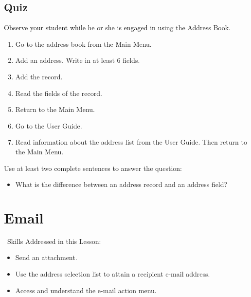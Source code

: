 \documentclass[10pt,letterpaper,twoside]{report}
\begin{document}
{{{\clearpage
\subsection{Quiz}
Observe your student while he or she is engaged in using the Address Book.
\begin{enumerate}
	\item Go to the address book from the Main Menu.
	\item Add an address.  Write in at least 6 fields.
	\item Add the record.
	\item Read the fields of the record.
	\item Return to the Main Menu.
	\item Go to the User Guide.
	\item Read information about the address list from the User Guide.  Then return to the Main Menu.
\end{enumerate}

Use at least two complete sentences to answer the question:
\begin{itemize}
	\item What is the difference between an address record and an address field?
\end{itemize}

\clearpage
\section{ Email}
\
Skills Addressed in this Lesson:
\begin{itemize}
	\item Send an attachment.
	\item Use the address selection list to attain a recipient e-mail address.
	\item Access and understand the e-mail action menu.
\end{itemize}
}}}
\end{document}
